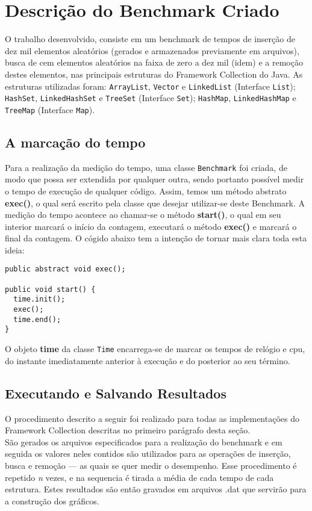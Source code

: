 \section{Descrição do Benchmark Criado} \label{sec:desc_bench}
	O trabalho desenvolvido, consiste em um benchmark de tempos de inserção de dez mil elementos aleatórios (gerados e armazenados previamente em arquivos), busca de cem elementos aleatórios na faixa de zero a dez mil (idem) e a remoção destes elementos, nas principais estruturas do Framework Collection do Java. As estruturas utilizadas foram: \texttt{ArrayList}, \texttt{Vector} e \texttt{LinkedList} (Interface \texttt{List}); \texttt{HashSet}, \texttt{LinkedHashSet} e \texttt{TreeSet} (Interface \texttt{Set}); \texttt{HashMap}, \texttt{LinkedHashMap} e \texttt{TreeMap} (Interface \texttt{Map}).\\
\subsection{A marcação do tempo}
	Para a realização da medição do tempo, uma classe \texttt{Benchmark} foi criada, de modo que possa ser extendida por qualquer outra, sendo portanto possível medir o tempo de execução de qualquer código. Assim, temos um método abstrato \textbf{exec()}, o qual será escrito pela classe que desejar utilizar-se deste Benchmark. A medição do tempo acontece ao chamar-se o método \textbf{start()}, o qual em seu interior marcará o início da contagem, executará o método \textbf{exec()} e marcará o final da contagem. O cógido abaixo tem a intenção de tornar mais clara toda esta ideia:\\
	\begin{verbatim}
public abstract void exec();

public void start() {
  time.init();
  exec();
  time.end();
}
	\end{verbatim}
	O objeto \textbf{time} da classe \texttt{Time} encarrega-se de marcar os tempos de relógio e cpu, do instante imediatamente anterior à execução e do posterior ao seu término.\\
\subsection{Executando e Salvando Resultados}
	O procedimento descrito a seguir foi realizado para todas as implementações do Framework Collection descritas no primeiro parágrafo desta seção.\\
	São gerados os arquivos especificados para a realização do benchmark e em seguida os valores neles contidos são utilizados para as operações de inserção, busca e remoção --- as quais se quer medir o desempenho. Esse procedimento é repetido \textsl{n} vezes, e na sequencia é tirada a média de cada tempo de cada estrutura. Estes resultados são então gravados em arquivos .dat que servirão para a construção dos gráficos.
